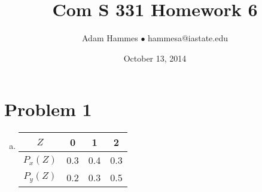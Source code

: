 \documentclass[11pt]{article}
\begin{document}
\title{Com S 331 Homework 6}
\author{Adam Hammes $\bullet$ hammesa@iastate.edu}
\date{October 13, 2014}
\maketitle

\section*{Problem 1}
\begin{enumerate}[(a)]
	\item
		\begin{tabular}{ c | c c c}
			$Z$	& 0 & 1 & 2 \\
			\hline
			$P_x(Z)$ & 0.3 & 0.4 & 0.3 \\
			$P_y(Z)$ & 0.2 & 0.3 & 0.5
		\end{tabular}


\end{enumerate}
\end{document}
